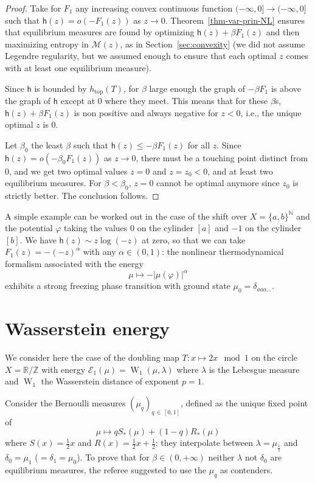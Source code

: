 \documentclass[AHL, Unicode, longabstracts,published]{cedram}
\theoremstyle{plain}
\theoremstyle{plain}
\renewcommand\top{{\mathrm{top}}}
\newcommand{\wass}{\operatorname{W}}
\newcommand{\hf}{\mathsf{h}}
\newcommand{\pot}{\varphi}
\newcommand*\be{\beta}
\newcommand*\8{\infty}
\newcommand\NN{\mathbb{N}}
\newcommand\RR{\mathbb{R}}
\newcommand\ZZ{\mathbb{Z}}
\newcommand{\En}{\mathcal{E}}
\newcommand{\cM}{\mathcal{M}}
\begin{document}
\begin{proof}
Take for $F_1$ any increasing convex continuous function $(-\infty,0]\to(-\infty,0]$ such that $\hf(z) = o(-F_1(z))$ as $z\to 0$. Theorem~\ref{thm-var-prin-NL} ensures that equilibrium measures are found by optimizing $\hf(z)+\beta F_1(z)$ and then maximizing entropy in $\cM(z)$, as in Section~\ref{sec:convexity} (we did not assume Legendre regularity, but we assumed enough to ensure that each optimal $z$ comes with at least one equilibrium measure).

Since $\hf$ is bounded by $h_\top(T)$, for $\beta$ large enough the graph of $-\beta F_1$ is above the graph of $\hf$ except at $0$ where they meet. This means that for these $\be$s, $\hf(z)+\be F_1(z)$ is non positive and always negative for $z<0$, i.e., the unique optimal $z$ is $0$.

Let $\beta_0$ the least $\beta$ such that $\hf(z)\le -\beta F_1(z)$ for all $z$. Since $\hf(z) = o(-\beta_0 F_1(z))$ as $z\to 0$, there must be a touching point distinct from $0$, and we get two optimal values $z=0$ and $z=z_0<0$, and at least two equilibrium measures. For $\beta<\beta_0$, $z=0$ cannot be optimal anymore since $z_0$ is strictly better. The conclusion follows.
\end{proof}

A simple example can be worked out in the case of the shift over $X=\{a,b\}^{\NN}$ and the potential $\pot$ taking the values $0$ on the cylinder $[a]$ and $-1$ on the cylinder $[b]$. We have $\hf(z) \sim z\log(-z)$ at zero, so that we can take $F_1(z) = -(-z)^\alpha$ with any $\alpha\in(0,1)$: the nonlinear thermodynamical formalism associated with the energy
\[
\mu\mapsto -\lvert \mu(\pot)\rvert^\alpha
\]
exhibits a strong freezing phase transition with ground state $\mu_0=\delta_{aaa\dots}$.



\appendix
\section{Wasserstein energy}\label{sec-appendix}


We consider here the case of the doubling map $T:x\mapsto 2x\mod 1$ on the circle $X=\RR/\ZZ$ with energy $\En_1(\mu) = \wass_1(\mu,\lambda)$ where $\lambda$ is the Lebesgue measure and $\wass_1$ the Wasserstein distance of exponent $p=1$.

Consider the Bernoulli measures $(\mu_q)_{q\,\in\,[0,1]}$, defined as the unique fixed point of
\[
\mu\mapsto q S_*(\mu) + (1-q) R_*(\mu)
\]
where $S(x)=\frac12 x$ and $R(x)=\frac12 x+\frac12$; they interpolate between $\lambda=\mu_{\frac12}$ and $\delta_0=\mu_1$ ($=\delta_1=\mu_0$). To prove that for $\beta\in(0,+\infty)$ neither $\lambda$ not $\delta_0$ are equilibrium measures, the referee suggested to use the $\mu_q$ as contenders.
\end{document}
